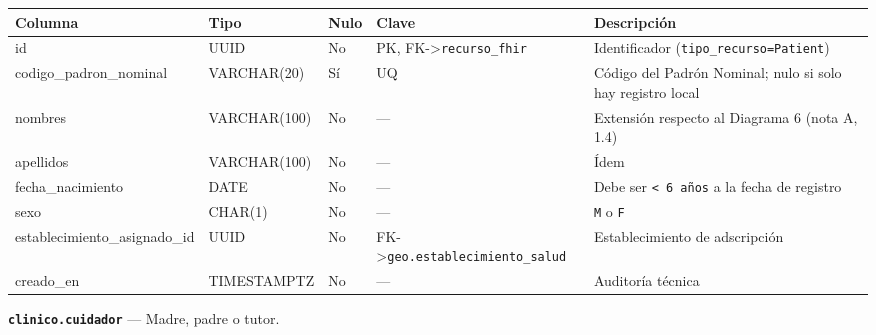 \documentclass[11pt,a4paper]{article}
\begin{document}
{\small
\begin{longtable}[]{@{}
  >{\raggedright\arraybackslash}p{}
  >{\raggedright\arraybackslash}p{}
  >{\raggedright\arraybackslash}p{}
  >{\raggedright\arraybackslash}p{}
  >{\raggedright\arraybackslash}p{}@{}}
\toprule\noalign{}
\begin{minipage}[b]{\linewidth}\raggedright
Columna
\end{minipage} & \begin{minipage}[b]{\linewidth}\raggedright
Tipo
\end{minipage} & \begin{minipage}[b]{\linewidth}\raggedright
Nulo
\end{minipage} & \begin{minipage}[b]{\linewidth}\raggedright
Clave
\end{minipage} & \begin{minipage}[b]{\linewidth}\raggedright
Descripción
\end{minipage} \\
\midrule\noalign{}
\endhead
\bottomrule\noalign{}
\endlastfoot
id & UUID & No & PK, FK-\textgreater{}\texttt{recurso\_fhir} & Identificador (\texttt{tipo\_recurso=\textquotesingle{}Patient\textquotesingle{}}) \\
codigo\_padron\_nominal & VARCHAR(20) & Sí & UQ & Código del Padrón Nominal; nulo si solo hay registro local \\
nombres & VARCHAR(100) & No & --- & Extensión respecto al Diagrama 6 (nota A, 1.4) \\
apellidos & VARCHAR(100) & No & --- & Ídem \\
fecha\_nacimiento & DATE & No & --- & Debe ser \texttt{\textless{}\ 6\ años} a la fecha de registro \\
sexo & CHAR(1) & No & --- & \texttt{M} o \texttt{F} \\
establecimiento\_asignado\_id & UUID & No & FK-\textgreater{}\texttt{geo.establecimiento\_salud} & Establecimiento de adscripción \\
creado\_en & TIMESTAMPTZ & No & --- & Auditoría técnica \\
\end{longtable}
}

\textbf{\texttt{clinico.cuidador}} --- Madre, padre o tutor.
\end{document}
